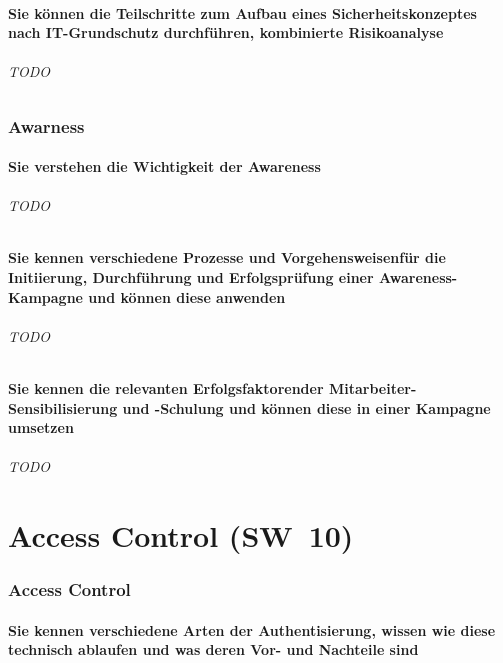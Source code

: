 \documentclass[10pt,a4paper]{article}
\begin{document}
\subsection*{Sie können die Teilschritte zum Aufbau eines Sicherheitskonzeptes nach IT-Grundschutz durchführen, kombinierte Risikoanalyse}
\paragraph*{TODO}

\section{Awarness}
\subsection*{Sie verstehen die Wichtigkeit der \flqq Awareness \frqq}
\paragraph*{TODO}
\subsection*{Sie kennen verschiedene Prozesse und Vorgehensweisenfür die Initiierung, Durchführung und Erfolgsprüfung einer Awareness-Kampagne und können diese anwenden}
\paragraph*{TODO}
\subsection*{Sie kennen die relevanten Erfolgsfaktorender Mitarbeiter-Sensibilisierung und -Schulung und können diese in einer Kampagne umsetzen}
\paragraph*{TODO}

\part{Access Control (SW~10)}
\section{Access Control}
\subsection*{Sie kennen verschiedene Arten der Authentisierung, wissen wie diese technisch ablaufen und was deren Vor- und Nachteile sind}
\end{document}
